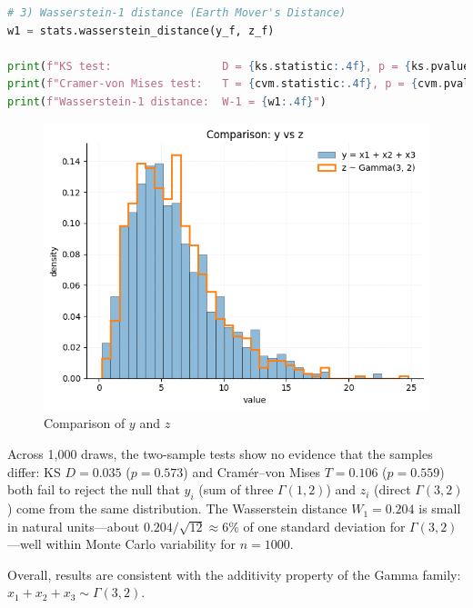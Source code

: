 \documentclass[dvipsnames,11pt]{article}
\begin{document}
\begin{enumerate}[label=\alph*.]
\begin{solution}
\begin{lstlisting}[language=python]
# 3) Wasserstein-1 distance (Earth Mover's Distance)
w1 = stats.wasserstein_distance(y_f, z_f)

print(f"KS test:                 D = {ks.statistic:.4f}, p = {ks.pvalue:.4g}")
print(f"Cramer-von Mises test:   T = {cvm.statistic:.4f}, p = {cvm.pvalue:.4g}")
print(f"Wasserstein-1 distance:  W-1 = {w1:.4f}")
\end{lstlisting}

                \begin{figure}[ht]
                    \centering
                    \includegraphics[width=0.5\linewidth]{q2d.png}
                    \caption{Comparison of \(y\) and \(z\)}
                    \label{fig:q2d}
                \end{figure}

                Across 1,000 draws, the two-sample tests show no evidence that the samples differ: KS $D=0.035$ ($p=0.573$) and Cramér–von Mises $T=0.106$ ($p=0.559$) both fail to reject the null that $y_i$ (sum of three $\Gamma(1,2)$) and $z_i$ (direct $\Gamma(3,2)$) come from the same distribution. The Wasserstein distance $W_1=0.204$ is small in natural units—about $0.204/\sqrt{12}\approx6\%$ of one standard deviation for $\Gamma(3,2)$—well within Monte Carlo variability for $n=1000$. 
                
                Overall, results are consistent with the additivity property of the Gamma family: $x_1+x_2+x_3 \sim \Gamma(3,2)$.
            
            \end{solution}
            
    \end{enumerate}
\end{document}
